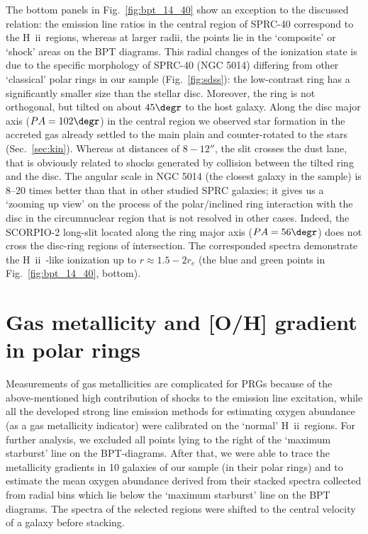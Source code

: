 \documentclass[useAMS,usenatbib]{mnras}
\newcommand{\HII}{H~{\sc ii}\ }
\begin{document}
The bottom panels in Fig.~\ref{fig:bpt_14_40} show  an exception to the discussed relation:  the emission line ratios in the central region of SPRC-40 correspond to the \HII regions, whereas at  larger radii, the points lie in the `composite' or `shock' areas on the BPT diagrams. This radial changes of the ionization state is due to the specific morphology of SPRC-40 (NGC 5014) differing from other `classical' polar rings in our sample (Fig.~\ref{fig:sdss}): the low-contrast ring has a significantly smaller size than the stellar disc. Moreover, the ring is not orthogonal, but tilted on about $45\degr$ to the host galaxy. Along the disc major axis ($PA=102\degr$) in the central region we observed star formation in the accreted gas already settled to the main plain and counter-rotated to the stars (Sec.~\ref{sec:kin}). Whereas at distances of $8-12''$, the slit crosses the dust lane, that is obviously related to shocks generated by collision between the tilted ring and the disc. The angular scale in NGC 5014 (the closest galaxy in the sample) is 8--20 times better than that in other studied SPRC galaxies; it gives us a `zooming up view' on the process of the polar/inclined ring interaction with the disc in the circumnuclear region that is not resolved in other cases. 
Indeed, the SCORPIO-2 long-slit located along the  ring major axis ($PA=56\degr$) does not cross the disc-ring regions of intersection. The corresponded spectra demonstrate the \HII-like ionization up to  $r\approx1.5-2r_e$ (the blue and green points in Fig.~\ref{fig:bpt_14_40}, bottom).







\section{Gas metallicity and [O/H] gradient in polar rings}
\label{sec:metallicity}


Measurements of gas metallicities are complicated for PRGs because of the above-mentioned high contribution of shocks to the emission line excitation, while all the developed strong line emission methods for estimating oxygen abundance (as a gas metallicity indicator) were calibrated on the `normal' \HII regions. For further analysis, we excluded all points lying to the right of the `maximum starburst' line on the BPT-diagrams. After that, we were able to trace the metallicity gradients in 10 galaxies of our sample (in their polar rings) and to estimate the mean oxygen abundance derived from their stacked spectra collected  from  radial bins which   lie below the `maximum starburst' line on the BPT diagrams. The spectra of the selected regions were shifted to the central velocity of a galaxy before stacking.
\end{document}
